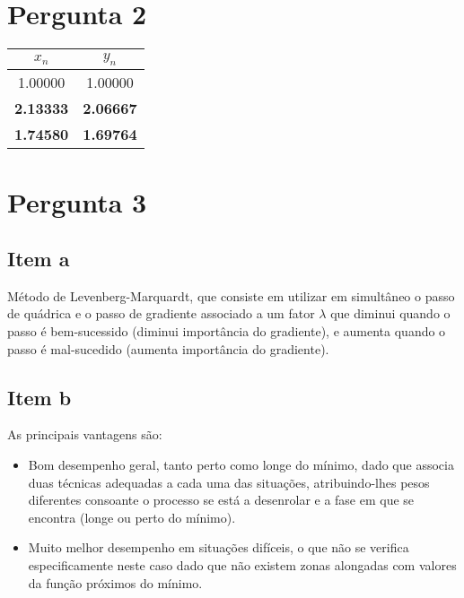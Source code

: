 {\section{Pergunta 2}


\begin{center}
    \begin{tabular}{c | c}
        $x_n$ & $y_n$ \\ \hline
        1.00000 & 1.00000 \\
        \textbf{2.13333} & \textbf{2.06667} \\
        \textbf{1.74580} & \textbf{1.69764}
    \end{tabular}
\end{center}

\section{Pergunta 3}
\subsection{Item a}
Método de Levenberg-Marquardt, que consiste em utilizar em simultâneo o passo de quádrica e o passo de gradiente associado a um fator $\lambda$ que diminui quando o passo é bem-sucessido (diminui importância do gradiente), e aumenta quando o passo é mal-sucedido (aumenta importância do gradiente).

\subsection{Item b}
As principais vantagens são:
\begin{itemize}
    \item Bom desempenho geral, tanto perto como longe do mínimo, dado que associa duas técnicas adequadas a cada uma das situações, atribuindo-lhes pesos diferentes consoante o processo se está a desenrolar e a fase em que se encontra (longe ou perto do mínimo).
    \item Muito melhor desempenho em situações difíceis, o que não se verifica especificamente neste caso dado que não existem zonas alongadas com valores da função próximos do mínimo.
\end{itemize}

}
